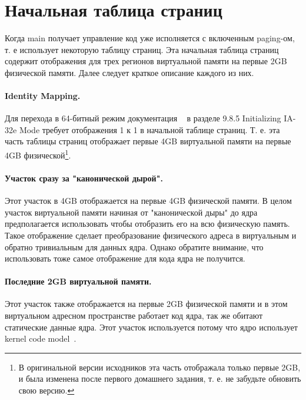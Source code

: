 \section{Начальная таблица страниц}

Когда main получает управление код уже исполняется с включенным paging-ом, т. е
использует некоторую таблицу страниц. Эта начальная таблица страниц содержит
отображения для трех регионов виртуальной памяти на первые 2GB физической
памяти. Далее следует краткое описание каждого из них.

\paragraph{Identity Mapping.} Для перехода в 64-битный режим документация
~\cite{INTEL:SYSV3} в разделе 9.8.5 Initializing IA-32e Mode требует
отображения 1 к 1 в начальной таблице страниц. Т. е. эта часть таблицы страниц
отображает первые 4GB виртуальной памяти на первые 4GB физической\footnote{В
оригинальной версии исходников эта часть отображала только первые 2GB, и была
изменена после первого домашнего задания, т. е. не забудьте обновить свою
версию.}.

\paragraph{Участок сразу за "канонической дырой".} Этот участок в 4GB
отображается на первые 4GB физической памяти. В целом участок виртуальной памяти
начиная от "канонической дыры" до ядра предполагается использовать чтобы
отобразить его на всю физическую память. Такое отображение сделает
преобразование физического адреса в виртуальным и обратно тривиальным для данных
ядра. Однако обратите внимание, что использовать тоже самое отображение для кода
ядра не получится.

\paragraph{Последние 2GB виртуальной памяти.} Этот участок также отображается на
первые 2GB физической памяти и в этом виртуальном адресном пространстве работает
код ядра, так же обитают статические данные ядра. Этот участок используется
потому что ядро использует kernel code model~\cite{AMD64:ABI}.

